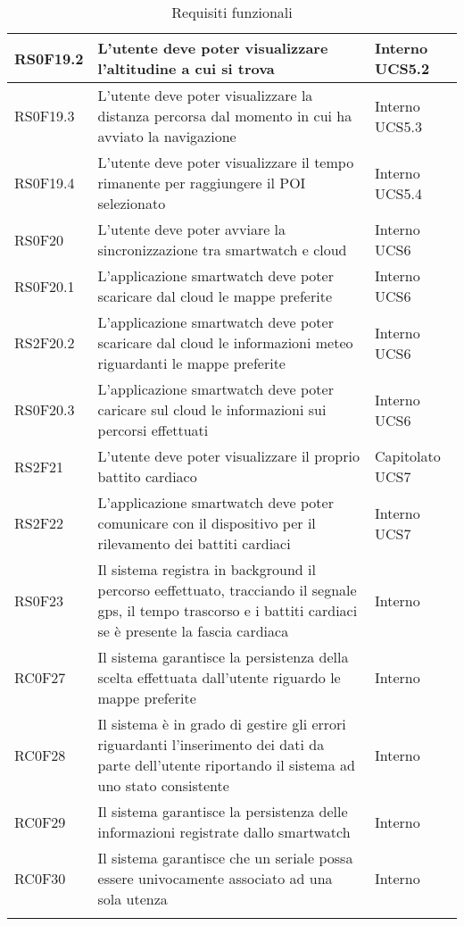 \begin{center}
\begin{longtable}{|l|p{7cm}|p{1.7cm}|}
RS0F19.2	& L'utente deve poter visualizzare l'altitudine a cui si trova & Interno UCS5.2 \\\hline
RS0F19.3	& L'utente deve poter visualizzare la distanza percorsa dal momento in cui ha avviato la navigazione & Interno UCS5.3 \\\hline
RS0F19.4	& L'utente deve poter visualizzare il tempo rimanente per raggiungere il POI selezionato & Interno UCS5.4 \\\hline
RS0F20		& L'utente deve poter avviare la sincronizzazione tra smartwatch e cloud & Interno UCS6 \\\hline
RS0F20.1	& L'applicazione smartwatch deve poter scaricare dal cloud le mappe preferite & Interno UCS6 \\\hline
RS2F20.2	& L'applicazione smartwatch deve poter scaricare dal cloud le informazioni meteo riguardanti le mappe preferite & Interno UCS6 \\\hline
RS0F20.3	& L'applicazione smartwatch deve poter caricare sul cloud le informazioni sui percorsi effettuati & Interno UCS6 \\\hline
RS2F21		& L'utente deve poter visualizzare il proprio battito cardiaco & Capitolato UCS7 \\\hline
RS2F22		& L'applicazione smartwatch deve poter comunicare con il dispositivo per il rilevamento dei battiti cardiaci & Interno UCS7 \\\hline
RS0F23		& Il sistema registra in background il percorso eeffettuato, tracciando il segnale gps, il tempo trascorso e i battiti cardiaci se è presente la fascia cardiaca & Interno \\\hline
RC0F27		& Il sistema garantisce la persistenza della scelta effettuata dall'utente riguardo le mappe preferite & Interno \\\hline
RC0F28		& Il sistema è in grado di gestire gli errori riguardanti l'inserimento dei dati da parte dell'utente riportando il sistema ad uno stato consistente & Interno \\\hline
RC0F29		& Il sistema garantisce la persistenza delle informazioni registrate dallo smartwatch & Interno \\\hline
RC0F30		& Il sistema garantisce che un seriale possa essere univocamente associato ad una sola utenza & Interno \\\hline
\caption{Requisiti funzionali}
\end{longtable}
\egroup
\end{center}

